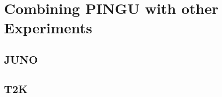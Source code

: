 \section{Combining PINGU with other Experiments}
\label{sec:comb}


\subsection{JUNO}
\label{sec:JUNO}


\subsection{T2K}
\label{sec:T2K}